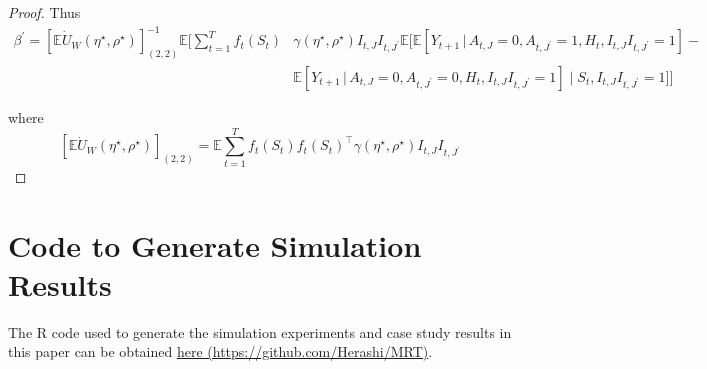\documentclass[12pt]{article}
\def\E{\mathbb{E}}
\def\given{\, | \,}
\begin{document}
\begin{proof}
Thus
\begin{align}
\label{eq:estimand_beta}
    \beta^\prime =\left[\E \dot U_W(\eta^\star,\rho^\star) \right]_{(2,2)}^{-1} \E \Bigg[\sum_{t=1}^T  f_t (S_t) &\gamma(\eta^\star,\rho^\star) I_{t,J}I_{t,J^\prime}  \E \Big[\E \left[Y_{t+1} \given{A_{t,J}=0,A_{t,J^\prime}=1, H_t ,I_{t,J}I_{t,J^\prime}=1} \right] - \nonumber \\
   &\E \left[Y_{t+1} \given{A_{t,J}=0,A_{t,J^\prime}=0, H_t ,I_{t,J}I_{t,J^\prime}=1} \right] \mid S_t,I_{t,J}I_{t,J^\prime}=1\Big]  \Bigg]
\end{align}

where
\[
\left[\E \dot U_W(\eta^\star,\rho^\star) \right]_{(2,2)} =\E \sum_{t=1}^T  f_t (S_t)f_t (S_t)^\top \gamma(\eta^\star,\rho^\star) I_{t,J}I_{t,J^\prime}
\]
\end{proof}


\section{Code to Generate Simulation Results}
The R code used to generate the simulation experiments and case study results in this paper can be obtained \hyperlink{https://github.com/Herashi/MRT}{here (https://github.com/Herashi/MRT)}.
\end{document}

